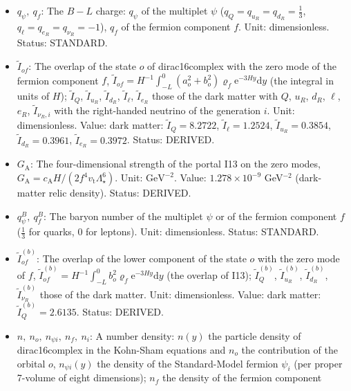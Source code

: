 \documentclass[
  10pt,
]{article}
\begin{document}
\begin{itemize}
  Unit: \(\mathrm{GeV}^{-2}\). Value: benchmark \(4.38\times10^{-17}\)
  GeV\(^{-2}\) (\(\Delta N_{\mathrm{eff}} = 0.001\)). Status: DERIVED.
\item
  \(q_\psi,\ q_f\): The \(B - L\) charge: \(q_\psi\) of the multiplet
  \(\psi\) (\(q_Q = q_{u_R} = q_{d_R} = \frac13\),
  \(q_\ell = q_{e_R} = q_{\nu_R} = -1\)), \(q_f\) of the fermion
  component \(f\). Unit: dimensionless. Status: STANDARD.
\item
  \(\tilde I_{of}\): The overlap of the state \(o\) of dirac16complex
  with the zero mode of the fermion component \(f\),
  \(\tilde I_{of} = H^{-1}\int_{-L}^{0}(a_o^2 + b_o^2)\varrho_f\mathrm{e}^{-3Hy}\mathrm{d}y\)
  (the integral in units of \(H\)); \(\tilde I_Q\), \(\tilde I_{u_R}\),
  \(\tilde I_{d_R}\), \(\tilde I_\ell\), \(\tilde I_{e_R}\) those of the
  dark matter with \(Q\), \(u_R\), \(d_R\), \(\ell\), \(e_R\),
  \(\tilde I_{\nu_R,i}\) with the right-handed neutrino of the
  generation \(i\). Unit: dimensionless. Value: dark matter:
  \(\tilde I_Q = 8.2722\), \(\tilde I_\ell = 1.2524\),
  \(\tilde I_{u_R} = 0.3854\), \(\tilde I_{d_R} = 0.3961\),
  \(\tilde I_{e_R} = 0.3972\). Status: DERIVED.
\item
  \(G_{\mathrm{A}}\): The four-dimensional strength of the portal I13 on
  the zero modes,
  \(G_{\mathrm{A}} = c_{\mathrm{A}}H/(2f^4v_{\mathrm{t}}\Lambda_\star^6)\).
  Unit: \(\mathrm{GeV}^{-2}\). Value: \(1.278\times10^{-9}\)
  GeV\(^{-2}\) (dark-matter relic density). Status: DERIVED.
\item
  \(q^B_\psi,\ q^B_f\): The baryon number of the multiplet \(\psi\) or
  of the fermion component \(f\) (\(\frac13\) for quarks, 0 for
  leptons). Unit: dimensionless. Status: STANDARD.
\item
  \(\tilde I^{(b)}_{of}\): The overlap of the lower component of the
  state \(o\) with the zero mode of \(f\),
  \(\tilde I^{(b)}_{of} = H^{-1}\int_{-L}^{0}b_o^2\varrho_f\mathrm{e}^{-3Hy}\mathrm{d}y\)
  (the overlap of I13); \(\tilde I^{(b)}_Q\), \(\tilde I^{(b)}_{u_R}\),
  \(\tilde I^{(b)}_{d_R}\), \(\tilde I^{(b)}_{\nu_R}\) those of the dark
  matter. Unit: dimensionless. Value: dark matter:
  \(\tilde I^{(b)}_Q = 2.6135\). Status: DERIVED.
\item
  \(n,\ n_o,\ n_{\psi i},\ n_f,\ n_i\): A number density: \(n(y)\) the
  particle density of dirac16complex in the Kohn-Sham equations and
  \(n_o\) the contribution of the orbital \(o\), \(n_{\psi i}(y)\) the
  density of the Standard-Model fermion \(\psi_i\) (per proper 7-volume
  of eight dimensions); \(n_f\) the density of the fermion component

\end{itemize}
\end{document}
